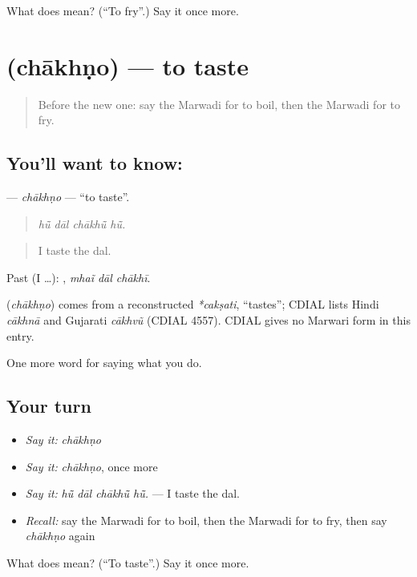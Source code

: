 \begin{tcolorbox}[breakable,colback=teal!4,colframe=teal!35!black,title={Before you move on}]
What does  mean? (\textquotedblleft{}To fry\textquotedblright{}.) Say it once more.
\end{tcolorbox}
\section[\texorpdfstring{\mw{चाखणो} (chākhṇo)}{चाखणो (chākhṇo)}]{ (chākhṇo) — to taste}

\label{lesson:MW-C169-chakhno}



\begin{quote}
Before the new one: say the Marwadi for to boil, then the Marwadi for to fry.
\end{quote}

\subsection*{You'll want to know: }
\textbf{} — \emph{chākhṇo} — \textquotedblleft{}to taste\textquotedblright{}.

\begin{quote}
   
\end{quote}

\begin{quote}
\emph{hū̃ dāl chākhū̃ hū̃.}
\end{quote}

\begin{quote}
I taste the dal.
\end{quote}

Past (I …):   , \emph{mhaĩ dāl chākhī}.

\begin{cousinweb}
\textbf{} (\emph{chākhṇo}) comes from a reconstructed \emph{*cakṣati}, \textquotedblleft{}tastes\textquotedblright{}; CDIAL lists Hindi \emph{cākhnā} and Gujarati \emph{cākhvũ} (CDIAL 4557). CDIAL gives no Marwari form in this entry.
\end{cousinweb}

\begin{grammarlens}[title={What you've built}]
One more word for saying what you do.
\end{grammarlens}

\subsection*{Your turn}
\begin{itemize}
\raggedright
  \item \emph{Say it:} \emph{chākhṇo}
  \item \emph{Say it:} \emph{chākhṇo}, once more
  \item \emph{Say it:} \emph{hū̃ dāl chākhū̃ hū̃.} — I taste the dal.
  \item \emph{Recall:} say the Marwadi for to boil, then the Marwadi for to fry, then say \emph{chākhṇo} again
\end{itemize}

\begin{tcolorbox}[breakable,colback=teal!4,colframe=teal!35!black,title={Before you move on}]
What does  mean? (\textquotedblleft{}To taste\textquotedblright{}.) Say it once more.
\end{tcolorbox}
